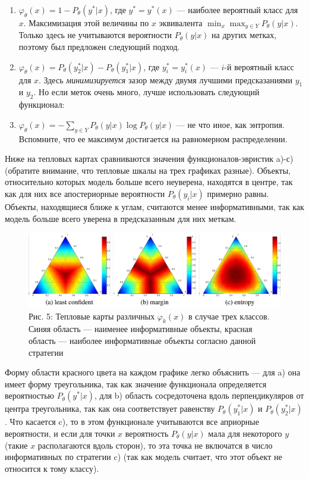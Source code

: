\documentclass[]{article}
\begin{document}
\begin{enumerate}
\def\labelenumi{\alph{enumi})}
\item
  \(\varphi_{\theta}(x) = 1 - P_{\theta}(y^*|x)\), где \(y^* = y^*(x)\)
  --- наиболее вероятный класс для \(x\). Максимизация этой величины по
  \(x\) эквивалента \(\min_x\max_{y\in Y} P_{\theta}(y|x)\). Только
  здесь не учитываются вероятности \(P_{\theta}(y|x)\) на других метках,
  поэтому был предложен следующий подход.
\item
  \(\varphi_{\theta}(x) = P_{\theta}(y^*_2|x) - P_{\theta}(y^*_1|x)\),
  где \(y^*_i = y^*_i(x)\) --- \(i\)-й вероятный класс для \(x\). Здесь
  \emph{минимизируется} зазор между двумя лучшими предсказаниями \(y_1\)
  и \(y_2\). Но если меток очень много, лучше использовать следующий
  функционал:
\item
  \(\varphi_{\theta}(x) = - \sum_{y \in Y} P_{\theta}(y|x) \log P_{\theta}(y|x)\)
  --- не что иное, как энтропия. Вспомните, что ее максимум достигается
  на равномерном распределении.
\end{enumerate}

Ниже на тепловых картах сравниваются значения функционалов-эвристик
a)-с) (обратите внимание, что тепловые шкалы на трех графиках разные).
Объекты, относительно которых модель больше всего неуверена, находятся в
центре, так как для них все апостериорные вероятности
\(P_{\theta}(y_i|x)\) примерно равны. Объекты, находящиеся ближе к
углам, считаются менее информативными, так как модель больше всего
уверена в предсказанным для них меткам.

\begin{figure}[htbp]
\centering
\includegraphics[width=7.29167in]{img/um.png}
\caption{Рис. 5: Тепловые карты различных \(\varphi_k(x)\) в случае трех
классов. Синяя область --- наименее информативные объекты, красная
область --- наиболее информативные объекты согласно данной стратегии}
\end{figure}

Форму области красного цвета на каждом графике легко объяснить --- для
a) она имеет форму треугольника, так как значение функционала
определяется вероятностью \(P_{\theta}(y^*|x)\), для b) область
сосредоточена вдоль перпендикуляров от центра треугольника, так как она
соответствует равенству \(P_{\theta}(y^*_1|x)\) и
\(P_{\theta}(y^*_2|x)\). Что касается c), то в этом функционале
учитываются все априорные вероятности, и если для точки \(x\)
вероятность \(P_{\theta}(y|x)\) мала для некоторого \(y\) (такие \(x\)
располагаются вдоль сторон), то эта точка не включатся в число
информативных по стратегии c) (так как модель считает, что этот объект
не относится к тому классу).
\end{document}
